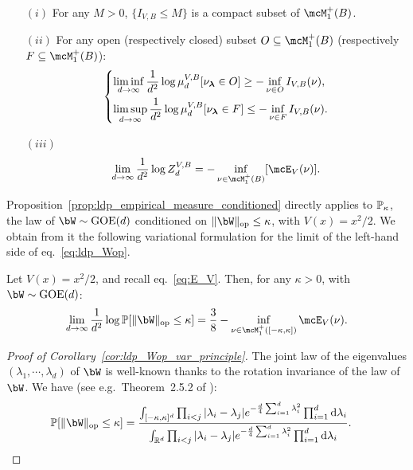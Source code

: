 {\begin{proposition}
\begin{itemize}
        \item[$(i)$] For any $M > 0$, $\{I_{V, B} \leq M\}$ is a compact subset of $\mcM_1^+(B)$.
        \item[$(ii)$]  
        For any open (respectively closed) subset $O \subseteq \mcM_1^+(B)$ (respectively $F \subseteq \mcM_1^+(B)$): 
        \begin{equation*}
            \begin{dcases}
                \liminf_{d\to\infty} \frac{1}{d^2} \log \mu_d^{V,B}[\nu_{\boldsymbol{\lambda}} \in O] \geq - \inf_{\nu \in O} I_{V,B}(\nu), \\
                \limsup_{d\to\infty} \frac{1}{d^2} \log \mu_d^{V,B}[\nu_{\boldsymbol{\lambda}} \in F] \leq - \inf_{\nu \in F} I_{V,B}(\nu).
            \end{dcases}
        \end{equation*}
        \item[$(iii)$] 
        \begin{equation*}
            \lim_{d \to \infty} \frac{1}{d^2} \log Z_d^{V,B} = - \inf_{\nu \in \mcM_1^+(B)}[\mcE_V(\nu)].
        \end{equation*}
    \end{itemize}
\end{proposition}
\noindent
 Proposition~\ref{prop:ldp_empirical_measure_conditioned} directly applies to $\mathbb{P}_\kappa$, the law of $\bW \sim \GOE(d)$ conditioned on $\|\bW\|_\op \leq \kappa$, 
 with $V(x) = x^2/2$. We obtain from it the following variational formulation for the limit of the left-hand side of eq.~\eqref{eq:ldp_Wop}.
 \begin{corollary}\label{cor:ldp_Wop_var_principle}
    Let $V(x) = x^2/2$, and recall eq.~\eqref{eq:E_V}. Then, for any $\kappa > 0$, with $\bW \sim \GOE(d)$:
    \begin{equation*}
        \lim_{d \to \infty} \frac{1}{d^2} \log \bbP[\|\bW\|_\op \leq \kappa] = \frac{3}{8} - \inf_{\nu \in \mcM_1^+([-\kappa,\kappa])} \mcE_{V}(\nu).
    \end{equation*}
 \end{corollary}
 \begin{proof}[Proof of Corollary~\ref{cor:ldp_Wop_var_principle}]
    The joint law of the eigenvalues $(\lambda_1, \cdots, \lambda_d)$ of $\bW$ is well-known thanks to the rotation invariance of the law of $\bW$. 
We have (see e.g.\ Theorem~2.5.2 of \cite{anderson2010introduction}):
\begin{align}\label{eq:joint_law_evalues}
    \bbP[\|\bW\|_\op \leq \kappa] &= \frac{\int_{[-\kappa,\kappa]^d} \prod_{i < j} |\lambda_i - \lambda_j| e^{-\frac{d}{4} \sum_{i=1}^d \lambda_i^2} \prod_{i=1}^d \rd \lambda_i}{\int_{\bbR^d} \prod_{i < j} |\lambda_i - \lambda_j| e^{-\frac{d}{4} \sum_{i=1}^d \lambda_i^2} \prod_{i=1}^d \rd \lambda_i}.

\end{align}
\end{proof}}
